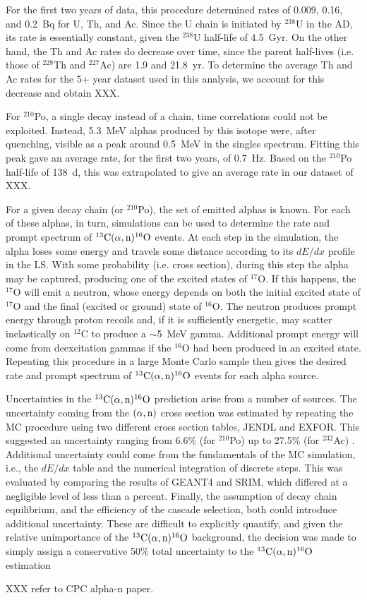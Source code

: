 \documentclass[../thesis.tex]{subfiles}
\begin{document}
For the first two years of data, this procedure determined rates of 0.009, 0.16, and 0.2~Bq for U, Th, and Ac. Since the U chain is initiated by $^{238}$U in the AD, its rate is essentially constant, given the $^{238}$U half-life of 4.5~Gyr. On the other hand, the Th and Ac rates do decrease over time, since the parent half-lives (i.e. those of $^{228}$Th and $^{227}$Ac) are 1.9 and 21.8~yr. To determine the average Th and Ac rates for the 5+ year dataset used in this analysis, we account for this decrease and obtain XXX.

For $^{210}$Po, a single decay instead of a chain, time correlations could not be exploited. Instead, 5.3~MeV alphas produced by this isotope were, after quenching, visible as a peak around 0.5~MeV in the singles spectrum. Fitting this peak gave an average rate, for the first two years, of 0.7~Hz. Based on the $^{210}$Po half-life of 138~d, this was extrapolated to give an average rate in our dataset of XXX.

For a given decay chain (or $^{210}$Po), the set of emitted alphas is known. For each of these alphas, in turn, simulations can be used to determine the rate and prompt spectrum of $^{13}\mathrm{C}(\alpha, \mathrm{n})^{16}\mathrm{O}$ events. At each step in the simulation, the alpha loses some energy and travels some distance according to its $dE/dx$ profile in the LS. With some probability (i.e. cross section), during this step the alpha may be captured, producing one of the excited states of $^{17}$O. If this happens, the $^{17}$O will emit a neutron, whose energy depends on both the initial excited state of $^{17}$O and the final (excited or ground) state of $^{16}$O. The neutron produces prompt energy through proton recoils and, if it is sufficiently energetic, may scatter inelastically on $^{12}$C to produce a $\sim$5~MeV gamma. Additional prompt energy will come from deexcitation gammas if the $^{16}$O had been produced in an excited state. Repeating this procedure in a large Monte Carlo sample then gives the desired rate and prompt spectrum of $^{13}\mathrm{C}(\alpha, \mathrm{n})^{16}\mathrm{O}$ events for each alpha source.

Uncertainties in the $^{13}\mathrm{C}(\alpha, \mathrm{n})^{16}\mathrm{O}$ prediction arise from a number of sources. The uncertainty coming from the $(\alpha,\mathrm{n})$ cross section was estimated by repeating the MC procedure using two different cross section tables, JENDL and EXFOR. This suggested an uncertainty ranging from 6.6\% (for $^{210}$Po) up to 27.5\% (for $^{232}$Ac) \cite{Zhao_2014}. Additional uncertainty could come from the fundamentals of the MC simulation, i.e., the $dE/dx$ table and the numerical integration of discrete steps. This was evaluated by comparing the results of GEANT4 and SRIM, which differed at a negligible level of less than a percent. Finally, the assumption of decay chain equilibrium, and the efficiency of the cascade selection, both could introduce additional uncertainty. These are difficult to explicitly quantify, and given the relative unimportance of the $^{13}\mathrm{C}(\alpha, \mathrm{n})^{16}\mathrm{O}$ background, the decision was made to simply assign a conservative 50\% total uncertainty to the $^{13}\mathrm{C}(\alpha, \mathrm{n})^{16}\mathrm{O}$ estimation

XXX refer to CPC alpha-n paper.
\end{document}
